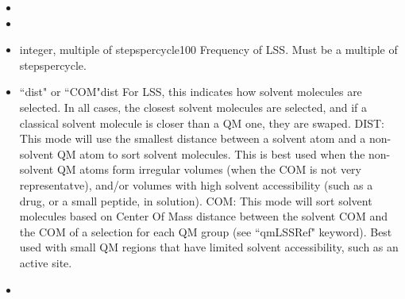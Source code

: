 \begin{itemize}
\item
{}

\item
{}

\item
{}%
{integer, multiple of stepspercycle}{100}{%
Frequency of LSS. Must be a multiple of stepspercycle.
}

\item
{}%
{``dist" or ``COM"}{dist}{%
For LSS, this indicates how solvent molecules are selected.
In all cases, the closest solvent molecules are selected,
and if a classical solvent molecule is closer than a QM one,
they are swaped. DIST: This mode will use the smallest distance
between a solvent atom and a non-solvent QM atom to sort solvent
molecules. This is best used when the non-solvent QM atoms form
irregular volumes (when the COM is not very representatve),
and/or volumes with high solvent accessibility (such as a drug,
or a small peptide, in solution). COM: This mode will sort solvent
molecules based on Center Of Mass distance between the solvent COM
and the COM of a selection for each QM group (see ``qmLSSRef" keyword).
Best used with small QM regions that have limited solvent accessibility,
such as an active site.
}

\item
{} %


\end{itemize}
